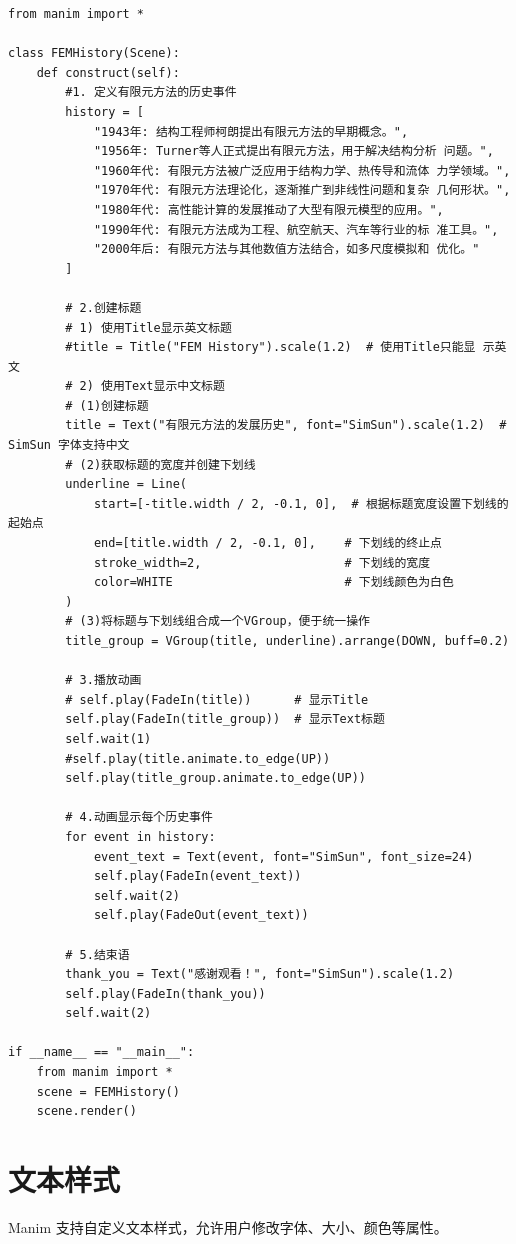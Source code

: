 \begin{lstlisting}[style=pythonstyle]
from manim import *

class FEMHistory(Scene):
    def construct(self):
        #1. 定义有限元方法的历史事件
        history = [
            "1943年: 结构工程师柯朗提出有限元方法的早期概念。",
            "1956年: Turner等人正式提出有限元方法，用于解决结构分析 问题。",
            "1960年代: 有限元方法被广泛应用于结构力学、热传导和流体 力学领域。",
            "1970年代: 有限元方法理论化，逐渐推广到非线性问题和复杂 几何形状。",
            "1980年代: 高性能计算的发展推动了大型有限元模型的应用。",
            "1990年代: 有限元方法成为工程、航空航天、汽车等行业的标 准工具。",
            "2000年后: 有限元方法与其他数值方法结合，如多尺度模拟和 优化。"
        ]

        # 2.创建标题
        # 1) 使用Title显示英文标题
        #title = Title("FEM History").scale(1.2)  # 使用Title只能显 示英文
        # 2) 使用Text显示中文标题
        # (1)创建标题
        title = Text("有限元方法的发展历史", font="SimSun").scale(1.2)  # SimSun 字体支持中文
        # (2)获取标题的宽度并创建下划线
        underline = Line(
            start=[-title.width / 2, -0.1, 0],  # 根据标题宽度设置下划线的起始点
            end=[title.width / 2, -0.1, 0],    # 下划线的终止点
            stroke_width=2,                    # 下划线的宽度
            color=WHITE                        # 下划线颜色为白色
        )
        # (3)将标题与下划线组合成一个VGroup，便于统一操作
        title_group = VGroup(title, underline).arrange(DOWN, buff=0.2)

        # 3.播放动画
        # self.play(FadeIn(title))      # 显示Title
        self.play(FadeIn(title_group))  # 显示Text标题
        self.wait(1)
        #self.play(title.animate.to_edge(UP))
        self.play(title_group.animate.to_edge(UP))

        # 4.动画显示每个历史事件
        for event in history:
            event_text = Text(event, font="SimSun", font_size=24)
            self.play(FadeIn(event_text))
            self.wait(2)
            self.play(FadeOut(event_text))

        # 5.结束语
        thank_you = Text("感谢观看！", font="SimSun").scale(1.2)
        self.play(FadeIn(thank_you))
        self.wait(2)

if __name__ == "__main__":
    from manim import *
    scene = FEMHistory()
    scene.render()
\end{lstlisting}  

\section{文本样式}
\label{sec:manim_text_formula_style}
Manim 支持自定义文本样式，允许用户修改字体、大小、颜色等属性。

